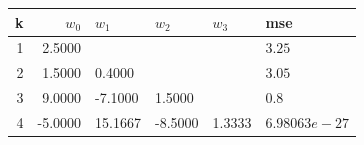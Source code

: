 \begin{tabular}{rrllll}
\toprule
k & $w_0$ & $w_1$ & $w_2$ & $w_3$ & mse \\
\midrule
1 & 2.5000 &   &   &   & $3.25$ \\
2 & 1.5000 & 0.4000 &   &   & $3.05$ \\
3 & 9.0000 & -7.1000 & 1.5000 &   & $0.8$ \\
4 & -5.0000 & 15.1667 & -8.5000 & 1.3333 & $6.98063e-27$ \\
\bottomrule
\end{tabular}
